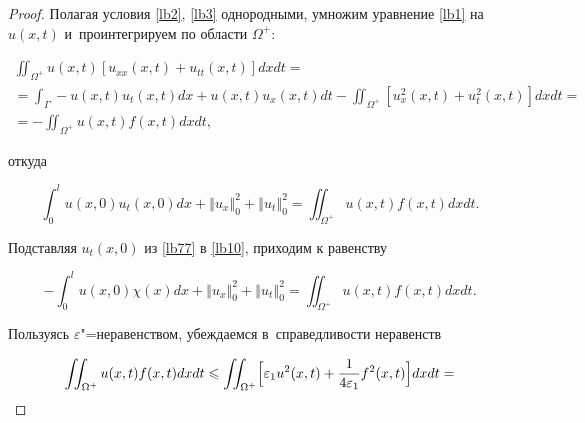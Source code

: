 \begin{proof}

Полагая условия \eqref{lb2},  \eqref{lb3} однородными, умножим уравнение \eqref{lb1} на $u(x, t)$ и~проинтегрируем по области $\Omega^{+}$:

\begin{multline}

\iint _{\Omega^{+}} u(x, t) \left[u_{xx}(x, t)+ u_{tt}(x, t)\right]dx dt=

\\

=\int _\Gamma -u(x, t) u_{t}(x, t)dx+u(x, t) u_{x}(x, t) dt-\iint _{\Omega^{+}} \left[u_{x}^{2}(x, t)+u_{t}^{2}(x, t)\right] dx dt=

\\

\label{lb9}

=-\iint _{\Omega^{+}}  u(x, t) f(x, t)dx dt,

\end{multline}

откуда

\begin{equation}

\label{lb10}

\int _{0}^{l} u(x, 0) u_{t}(x, 0)  dx+

\left\Vert u_{x} \right\Vert_{0}^{2}+\left\Vert u_{t} \right\Vert_{0}^{2}=\iint _{\Omega^{+}}  u(x, t) f(x, t)dx dt.

\end{equation}

Подставляя $u_{t}(x, 0)$ из \eqref{lb77} в \eqref{lb10}, приходим к равенству

\begin{equation}

\label{lb11}

-\int _{0}^{l} u(x, 0) \chi(x) dx+\left\Vert u_{x} \right\Vert_{0}^{2}+\left\Vert u_{t} \right\Vert_{0}^{2}=\iint _{\Omega^{+}}  u(x, t) f(x, t)dx dt.

\end{equation}





Пользуясь $\varepsilon$"=неравенством, убеждаемся в~справедливости неравенств

\begin{multline}

\iint _{\Omega^{+}} u(x, t) f(x, t)dx dt \leqslant 

\iint _{\Omega^{+}} \Bigl[\varepsilon_1 u^2 (x, t)+\frac{1}{4\varepsilon_1}f^{2}(x, t)\Bigr]dx dt=


\end{multline}
\end{proof}
